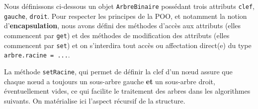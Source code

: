 \documentclass[
  letterpaper,
  DIV=11,
  numbers=noendperiod]{scrartcl}
\begin{document}
Nous définissons ci-dessous un objet \texttt{ArbreBinaire} possédant
trois attributs \texttt{clef}, \texttt{gauche}, \texttt{droit}. Pour
respecter les principes de la POO, et notamment la notion
d'\textbf{encapsulation}, nous avons défini des méthodes d'accès aux
attributs (elles commencent par \texttt{get}) et des méthodes de
modification des attributs (elles commencent par \texttt{set}) et on
s'interdira tout accès ou affectation direct(e) du type
\texttt{arbre.racine\ =\ ...}.

La méthode \texttt{setRacine}, qui permet de définir la clef d'un nœud
assure que chaque nœud a toujours un sous-arbre gauche \textbf{et} un
sous-arbre droit, éventuellement vides, ce qui facilite le traitement
des arbres dans les algorithmes suivants. On matérialise ici l'aspect
récursif de la structure.
\end{document}
